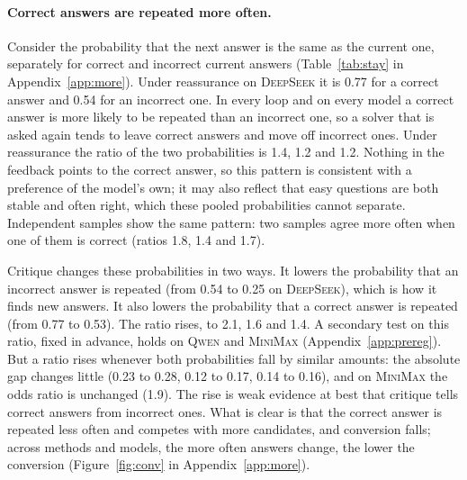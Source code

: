 \documentclass[11pt]{article}
\newcommand{\ds}{\textsc{DeepSeek}}
\newcommand{\qw}{\textsc{Qwen}}
\newcommand{\mm}{\textsc{MiniMax}}
\begin{document}
\paragraph{Correct answers are repeated more often.}
Consider the probability that the next answer is the same as the current one, separately for correct and incorrect current answers (Table~\ref{tab:stay} in Appendix~\ref{app:more}).
Under reassurance on \ds{} it is 0.77 for a correct answer and 0.54 for an incorrect one.
In every loop and on every model a correct answer is more likely to be repeated than an incorrect one, so a solver that is asked again tends to leave correct answers and move off incorrect ones.
Under reassurance the ratio of the two probabilities is 1.4, 1.2 and 1.2.
Nothing in the feedback points to the correct answer, so this pattern is consistent with a preference of the model's own; it may also reflect that easy questions are both stable and often right, which these pooled probabilities cannot separate.
Independent samples show the same pattern: two samples agree more often when one of them is correct (ratios 1.8, 1.4 and 1.7).

Critique changes these probabilities in two ways.
It lowers the probability that an incorrect answer is repeated (from 0.54 to 0.25 on \ds), which is how it finds new answers.
It also lowers the probability that a correct answer is repeated (from 0.77 to 0.53).
The ratio rises, to 2.1, 1.6 and 1.4.
A secondary test on this ratio, fixed in advance, holds on \qw{} and \mm{} (Appendix~\ref{app:prereg}).
But a ratio rises whenever both probabilities fall by similar amounts: the absolute gap changes little (0.23 to 0.28, 0.12 to 0.17, 0.14 to 0.16), and on \mm{} the odds ratio is unchanged (1.9).
The rise is weak evidence at best that critique tells correct answers from incorrect ones.
What is clear is that the correct answer is repeated less often and competes with more candidates, and conversion falls; across methods and models, the more often answers change, the lower the conversion (Figure~\ref{fig:conv} in Appendix~\ref{app:more}).
\end{document}
